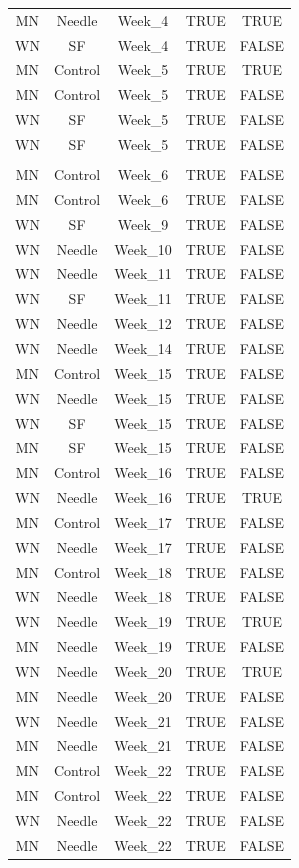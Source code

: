 \documentclass[
  12pt,
  letterpaper,
]{article}
\begin{document}
\begin{longtable}{ccccc}
MN & Needle & Week\_4 & TRUE & TRUE \\ 
WN & SF & Week\_4 & TRUE & FALSE \\ 
MN & Control & Week\_5 & TRUE & TRUE \\ 
MN & Control & Week\_5 & TRUE & FALSE \\ 
WN & SF & Week\_5 & TRUE & FALSE \\ 
WN & SF & Week\_5 & TRUE & FALSE \\ 
\midrule\addlinespace[2.5pt]
\multicolumn{5}{l}{Post-Infestion} \\[2.5pt] 
\midrule\addlinespace[2.5pt]
MN & Control & Week\_6 & TRUE & FALSE \\ 
MN & Control & Week\_6 & TRUE & FALSE \\ 
WN & SF & Week\_9 & TRUE & FALSE \\ 
WN & Needle & Week\_10 & TRUE & FALSE \\ 
WN & Needle & Week\_11 & TRUE & FALSE \\ 
WN & SF & Week\_11 & TRUE & FALSE \\ 
WN & Needle & Week\_12 & TRUE & FALSE \\ 
WN & Needle & Week\_14 & TRUE & FALSE \\ 
MN & Control & Week\_15 & TRUE & FALSE \\ 
WN & Needle & Week\_15 & TRUE & FALSE \\ 
WN & SF & Week\_15 & TRUE & FALSE \\ 
MN & SF & Week\_15 & TRUE & FALSE \\ 
MN & Control & Week\_16 & TRUE & FALSE \\ 
WN & Needle & Week\_16 & TRUE & TRUE \\ 
MN & Control & Week\_17 & TRUE & FALSE \\ 
WN & Needle & Week\_17 & TRUE & FALSE \\ 
MN & Control & Week\_18 & TRUE & FALSE \\ 
WN & Needle & Week\_18 & TRUE & FALSE \\ 
WN & Needle & Week\_19 & TRUE & TRUE \\ 
MN & Needle & Week\_19 & TRUE & FALSE \\ 
WN & Needle & Week\_20 & TRUE & TRUE \\ 
MN & Needle & Week\_20 & TRUE & FALSE \\ 
WN & Needle & Week\_21 & TRUE & FALSE \\ 
MN & Needle & Week\_21 & TRUE & FALSE \\ 
MN & Control & Week\_22 & TRUE & FALSE \\ 
MN & Control & Week\_22 & TRUE & FALSE \\ 
WN & Needle & Week\_22 & TRUE & FALSE \\ 
MN & Needle & Week\_22 & TRUE & FALSE \\ 
\bottomrule
\end{longtable}
\endgroup
\end{document}
